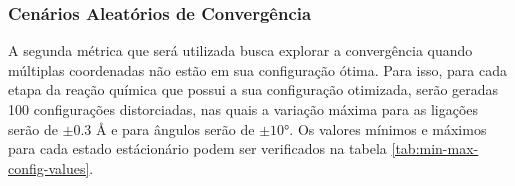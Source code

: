 \subsubsection{Cenários Aleatórios de Convergência}

A segunda métrica que será utilizada busca explorar a convergência quando múltiplas coordenadas não estão em sua configuração ótima. Para isso, para cada etapa da reação química que possui a sua configuração otimizada, serão geradas 100 configurações distorciadas, nas quais a variação máxima para as ligações serão de $\pm 0.3$ \AA{} e para ângulos serão de $\pm \ang{10}$. Os valores mínimos e máximos para cada estado estácionário podem ser verificados na tabela \ref{tab:min-max-config-values}.

\begin{table}[h]
\centering
  \caption{Valores mínimos e máximos que podem ser gerados nos cenários aleatórios de convergência para cada ponto estacionário da reação }
  \label{tab:min-max-config-values}
\end{table}
